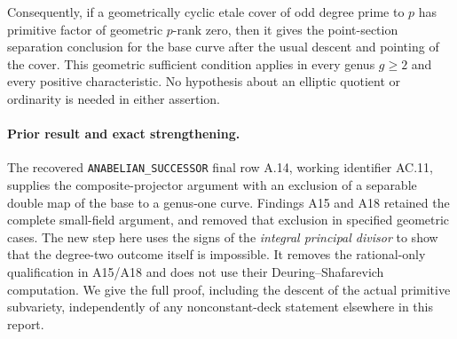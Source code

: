\documentclass[11pt,a4paper]{article}
\begin{document}
Consequently, if a geometrically cyclic etale cover of odd degree
prime to $p$ has primitive factor of geometric $p$-rank zero,
then it gives the point-section separation conclusion for the
base curve after the usual descent and pointing of the cover.
This geometric sufficient condition applies in every genus
$g\ge2$ and every positive characteristic.
No hypothesis about an elliptic quotient or ordinarity is needed
in either assertion.

\paragraph{Prior result and exact strengthening.}
The recovered \texttt{ANABELIAN\_SUCCESSOR} final row A.14,
working identifier AC.11, supplies the composite-projector
argument with an exclusion of a separable double map of the base
to a genus-one curve. Findings A15 and A18 retained the complete
small-field argument, and removed that exclusion in specified
geometric cases. The new step here uses the signs of the
\emph{integral principal divisor} to show that the degree-two
outcome itself is impossible. It removes the rational-only
qualification in A15/A18 and does not use their
Deuring--Shafarevich computation. We give the full proof, including
the descent of the actual primitive subvariety, independently of
any nonconstant-deck statement elsewhere in this report.
\end{document}
